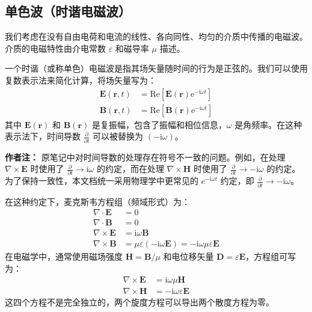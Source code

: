 \documentclass[fontset=none]{ctexart}
\begin{document}
\subsection{单色波（时谐电磁波）}
我们考虑在没有自由电荷和电流的线性、各向同性、均匀的介质中传播的电磁波。介质的电磁特性由介电常数 $\varepsilon$ 和磁导率 $\mu$ 描述。

\begin{definition}[时谐场]
一个时谐（或称单色）电磁波是指其场矢量随时间的行为是正弦的。我们可以使用复数表示法来简化计算，将场矢量写为：
\begin{equation}
\begin{aligned}
\bm{E}(\bm{r}, t) &= \mathrm{Re}[\bm{E}(\bm{r}) \mathrm{e}^{-\mathrm{i}\omega t}] \\
\bm{B}(\bm{r}, t) &= \mathrm{Re}[\bm{B}(\bm{r}) \mathrm{e}^{-\mathrm{i}\omega t}]
\end{aligned}
\end{equation}
其中 $\bm{E}(\bm{r})$ 和 $\bm{B}(\bm{r})$ 是复振幅，包含了振幅和相位信息，$\omega$ 是角频率。在这种表示法下，时间导数 $\frac{\partial}{\partial t}$ 可以被替换为 $(-\mathrm{i}\omega)$。
\end{definition}

\textbf{作者注：} 原笔记中对时间导数的处理存在符号不一致的问题。例如，在处理 $\nabla \times \bm{E}$ 时使用了 $\frac{\partial}{\partial t} \to \mathrm{i}\omega$ 的约定，而在处理 $\nabla \times \bm{H}$ 时使用了 $\frac{\partial}{\partial t} \to -\mathrm{i}\omega$ 的约定。为了保持一致性，本文档统一采用物理学中更常见的 $e^{-\mathrm{i}\omega t}$ 约定，即 $\frac{\partial}{\partial t} \to -\mathrm{i}\omega$。

在这种约定下，麦克斯韦方程组（频域形式）为：
\begin{equation}
\begin{aligned}
\nabla \cdot \bm{E} &= 0 \\
\nabla \cdot \bm{B} &= 0 \\
\nabla \times \bm{E} &= \mathrm{i}\omega \bm{B} \\
\nabla \times \bm{B} &= \mu\varepsilon(-\mathrm{i}\omega \bm{E}) = -\mathrm{i}\omega\mu\varepsilon\bm{E}
\end{aligned}
\end{equation}
在电磁学中，通常使用磁场强度 $\bm{H} = \bm{B}/\mu$ 和电位移矢量 $\bm{D} = \varepsilon\bm{E}$，方程组可写为：
\begin{equation}
\begin{aligned}
\nabla \times \bm{E} &= \mathrm{i}\omega\mu\bm{H} \\
\nabla \times \bm{H} &= -\mathrm{i}\omega\varepsilon\bm{E}
\end{aligned}
\end{equation}
这四个方程不是完全独立的，两个旋度方程可以导出两个散度方程为零。
\end{document}
